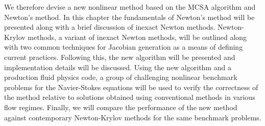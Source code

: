 We therefore devise a new nonlinear method based on the MCSA algorithm
and Newton's method. In this chapter the fundamentals of Newton's
method will be presented along with a brief discussion of inexact
Newton methods. Newton-Krylov methods, a variant of inexact Newton
methods, will be outlined along with two common techniques for
Jacobian generation as a means of defining current
practices. Following this, the new algorithm will be presented and
implementation details will be discussed. Using the new algorithm and
a production fluid physics code, a group of challenging nonlinear
benchmark problems for the Navier-Stokes equations will be used to
verify the correctness of the method relative to solutions obtained
using conventional methods in various flow regimes. Finally, we will
compare the performance of the new method against contemporary
Newton-Krylov methods for the same benchmark problems.

